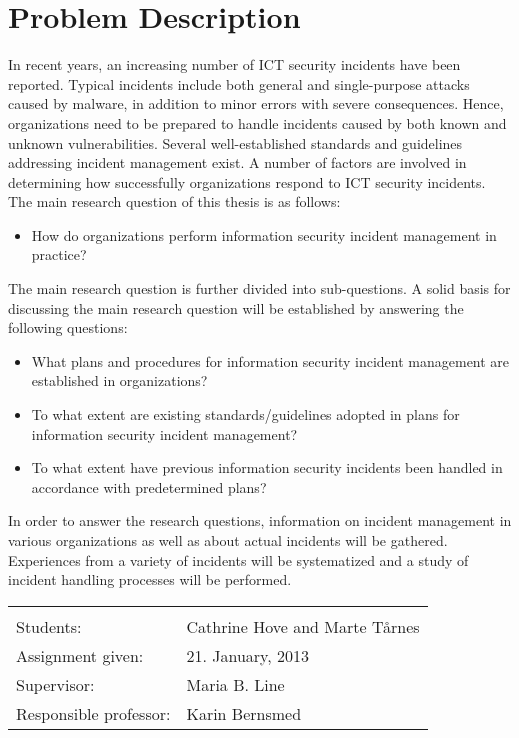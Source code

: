 \documentclass[b5paper, twoside, openright, 11pt]{report}
\begin{document}
\chapter*{Problem Description}
\vspace{-0.2cm}
In recent years, an increasing number of ICT security incidents have been reported. Typical incidents include both general and single-purpose attacks caused by malware, in addition to minor errors with severe consequences. Hence, organizations need to be prepared to handle incidents caused by both known and unknown vulnerabilities. Several well-established standards and guidelines addressing incident management exist. A number of factors are involved in determining how successfully organizations respond to ICT security incidents. \\

The main research question of this thesis is as follows: 
\begin{itemize}
\item How do organizations perform information security incident management in practice?
\end{itemize}

The main research question is further divided into sub-questions. A solid basis for discussing the main research question will be established by answering the following questions:\\

\begin{itemize}\itemsep-0.1cm
\item What plans and procedures for information security incident management are established in organizations?
\item To what extent are existing standards/guidelines adopted in plans for information security incident management?
\item To what extent have previous information security incidents been handled in accordance with predetermined plans? 
\end{itemize}

In order to answer the research questions, information on incident management in various organizations as well as about actual incidents will be gathered. Experiences from a variety of incidents will be systematized and a study of incident handling processes will be performed.


\begin{tabular}{@{}p{4cm}l}
\vspace{0.1cm} & \vspace{0.1cm} \\
Students:		& Cathrine Hove and Marte T\aa rnes \\
Assignment given: & 21. January, 2013 \\
Supervisor:		& Maria B. Line \\
Responsible professor: 	& Karin Bernsmed 
\end{tabular}
\end{document}
